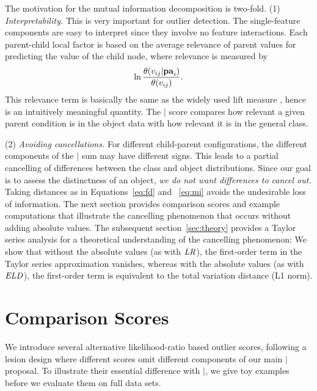{The motivation for the mutual information decomposition is two-fold. 
(1) {\em Interpretability.} This is very important for outlier detection. The single-feature components are easy to interpret since they involve no feature interactions. Each parent-child local factor is based on the average relevance of parent values for predicting the value of the child node, where relevance is measured by $$\ln \frac{\theta(v_{ij}|\mathbf{pa}_{i})}{\theta(v_{ij})}.$$ This relevance term  is basically the same as the widely used lift measure \citep{Tuffery2011}, hence is an intuitively meaningful quantity. The $\mid$ score compares how relevant a given parent condition is in the object data with how relevant it is in the general class. 


(2) {\em Avoiding cancellations.} 
For different child-parent configurations, the different components of the $\mid$ sum may have different signs. This leads to a partial cancelling of differences between the class and object distributions. Since our goal is to assess the distinctness of an object, {\em we do not want differences to cancel out.} Taking distances as in Equations~\eqref{eq:fd} and ~\eqref{eq:mi} avoids the undesirable loss of information. 
The next section provides comparison scores and example computations that illustrate the cancelling phenomenon that occurs without adding absolute values. The subsequent section~\ref{sec:theory} provides a Taylor series analysis for a theoretical understanding of the cancelling phenomenon: We show that without the absolute values (as with $\it{LR}$), the first-order term in the Taylor series approximation vanishes, whereas with the absolute values (as with $\it{ELD}$), the first-order term is equivalent to the total variation distance (L1 norm). 

\section{Comparison Scores} \label{sec:metrics}

We introduce several alternative likelihood-ratio based outlier scores, following a lesion design where different scores omit different components of our main $\mid$ proposal. %
To illustrate their essential difference with $\mid$, we give toy examples before we evaluate them on full data sets.

}
